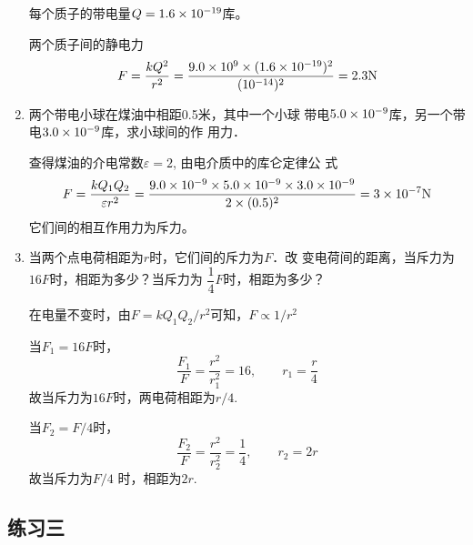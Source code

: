 \begin{enumerate}
\begin{solution}
    每个质子的带电量$Q=1.6\times10^{-19}$库。

    两个质子间的静电力
    \[F=\frac{kQ^2}{r^2}=\frac{9.0\times10^9\times(1.6\times10^{-19})^2}{(10^{-14})^2}=2.3{\rm N}\]
\end{solution}

\item 两个带电小球在煤油中相距0.5米，其中一个小球
带电$5.0\times10^{-9}$库，另一个带电$3.0\times10^{-9}$库，求小球间的作
用力．

\begin{solution}
    查得煤油的介电常数$\varepsilon=2$, 由电介质中的库仑定律公
    式
    \[F=\frac{kQ_1Q_2}{\varepsilon r^2}=\frac{9.0\times10^{-9}\times 5.0\times10^{-9}\times 3.0\times10^{-9}}{2\times (0.5)^2}=3\times 10^{-7}{\rm N}\]
    它们间的相互作用力为斥力。
\end{solution}

\item 当两个点电荷相距为$r$时，它们间的斥力为$F$．改
变电荷间的距离，当斥力为$16F$时，相距为多少？当斥力为
$\dfrac{1}{4}F$时，相距为多少？

\begin{solution}
    在电量不变时，由$F=kQ_1Q_2/r^2$可知，$F\propto 1/r^2$
    
    当$F_1=16F$时，
    \[\frac{F_1}{F}=\frac{r^2}{r^2_1}=16,\qquad r_1=\frac{r}{4}\]
    故当斥力为$16F$时，两电荷相距为$r/4$.
    
    当$F_2=F/4$时，
\[\frac{F_2}{F}=\frac{r^2}{r^2_2}=\frac{1}{4},\qquad r_2=2r\]
    故当斥力为$F/4$
    时，相距为$2r$.
\end{solution}

\end{enumerate}

\subsection{练习三}


